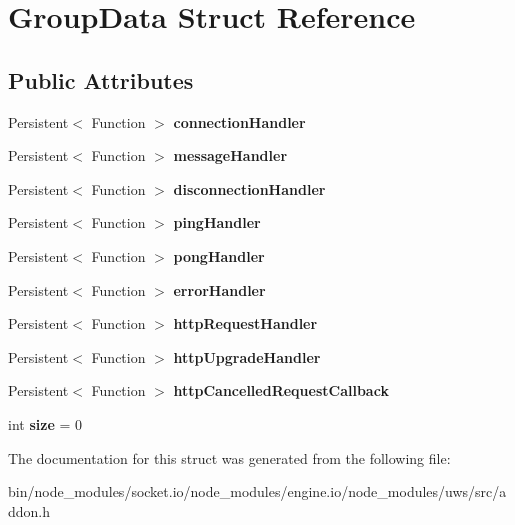\hypertarget{struct_group_data}{}\section{Group\+Data Struct Reference}
\label{struct_group_data}
\subsection*{Public Attributes}
\begin{DoxyCompactItemize}
\item 
\mbox{\label{struct_group_data_a55e97e422cc67d97cb0065045a079cbb}} 
Persistent$<$ Function $>$ {\bfseries connection\+Handler}
\item 
\mbox{\label{struct_group_data_aac685a8407732757049af48c24c250fa}} 
Persistent$<$ Function $>$ {\bfseries message\+Handler}
\item 
\mbox{\label{struct_group_data_ab5181aba1fdc92a14168e04f2a0bf3b9}} 
Persistent$<$ Function $>$ {\bfseries disconnection\+Handler}
\item 
\mbox{\label{struct_group_data_a21556a5edbbc899ba04a3f5e947a5a47}} 
Persistent$<$ Function $>$ {\bfseries ping\+Handler}
\item 
\mbox{\label{struct_group_data_a4a11d3d31b9d5b0e5c28834a9eb312cf}} 
Persistent$<$ Function $>$ {\bfseries pong\+Handler}
\item 
\mbox{\label{struct_group_data_aa6750c6639deb8e4f7583c7155b13cb1}} 
Persistent$<$ Function $>$ {\bfseries error\+Handler}
\item 
\mbox{\label{struct_group_data_a0cc74d6272da8664652abbb443bcd814}} 
Persistent$<$ Function $>$ {\bfseries http\+Request\+Handler}
\item 
\mbox{\label{struct_group_data_a197982b81eb376e388e4dd1542b2958d}} 
Persistent$<$ Function $>$ {\bfseries http\+Upgrade\+Handler}
\item 
\mbox{\label{struct_group_data_acb3db5f53d40dace85da751d24b9fd99}} 
Persistent$<$ Function $>$ {\bfseries http\+Cancelled\+Request\+Callback}
\item 
\mbox{\label{struct_group_data_ac3b1ccf25a6aee31b80001ed858bd4bf}} 
int {\bfseries size} = 0
\end{DoxyCompactItemize}


The documentation for this struct was generated from the following file\+:\begin{DoxyCompactItemize}
\item 
bin/node\+\_\+modules/socket.\+io/node\+\_\+modules/engine.\+io/node\+\_\+modules/uws/src/addon.\+h\end{DoxyCompactItemize}

